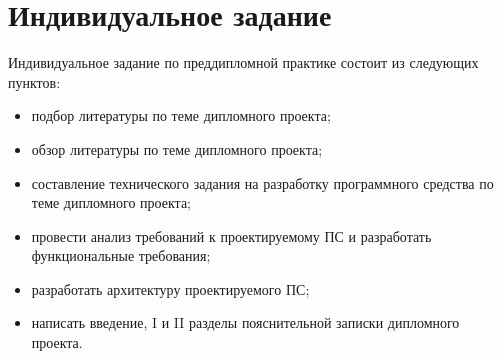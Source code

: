 \section{Индивидуальное задание}
\label{sec:practice:individual_task}

Индивидуальное задание по преддипломной практике состоит из следующих пунктов:
\begin{itemize}
  \item подбор литературы по теме дипломного проекта;
  \item обзор литературы по теме дипломного проекта;
  \item составление технического задания на разработку программного средства по теме дипломного проекта;
  \item провести анализ требований к проектируемому ПС и разработать функциональные требования;
  \item разработать архитектуру проектируемого ПС;
  \item написать введение, I и II разделы пояснительной записки дипломного проекта.
\end{itemize}
